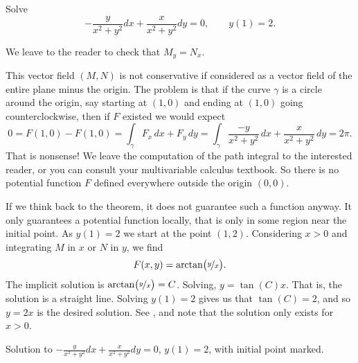\documentclass{ximera}
\begin{document}
\begin{example}
    Solve
    \begin{equation*}
        -\frac{y}{x^2+y^2} dx + \frac{x}{x^2+y^2} dy = 0 , \qquad y(1) = 2.
    \end{equation*}
\end{example}

\begin{exampleSol}
    We leave to the reader to check that $M_y = N_x$.
    
    This vector field $(M,N)$ is not conservative if considered as a vector field of the entire plane minus the origin.  The problem is that if the curve $\gamma$ is a circle around the origin, say starting at $(1,0)$ and ending at $(1,0)$ going counterclockwise, then if $F$ existed we would expect
    \begin{equation*}
        0 = F(1,0) - F(1,0) = \int_\gamma F_x \, dx + F_y \, dy = \int_\gamma \frac{-y}{x^2+y^2} \, dx + \frac{x}{x^2+y^2} \, dy = 2\pi .
    \end{equation*}
    That is nonsense! We leave the computation of the path integral to the interested reader, or you can consult your multivariable calculus textbook.  So there is no potential function $F$ defined everywhere outside the origin $(0,0)$.
    
    If we think back to the theorem, it does not guarantee such a function anyway.  It only guarantees a potential function locally, that is only in some region near the initial point.  As $y(1) = 2$ we start at the point $(1,2)$.  Considering $x > 0$ and integrating $M$ in $x$ or $N$ in $y$, we find
    \begin{equation*}
        F(x,y) = \operatorname{arctan} \bigl( \nicefrac{y}{x} \bigr) .
    \end{equation*}
    The implicit solution is $\operatorname{arctan} \bigl( \nicefrac{y}{x} \bigr) = C$.  Solving, $y = \tan(C) x$.  That is, the solution is a straight line.  Solving $y(1) = 2$ gives us that $\tan(C) = 2$, and so $y= 2x$ is the desired solution. See , and note that the solution only exists for $x > 0$.
    \begin{myfig}
        \capstart
        \caption{Solution to  $-\frac{y}{x^2+y^2} dx + \frac{x}{x^2+y^2} dy = 0$, $y(1) = 2$, with initial point marked.\label{exact:y2x}}
    \end{myfig}
\end{exampleSol}
\end{document}
